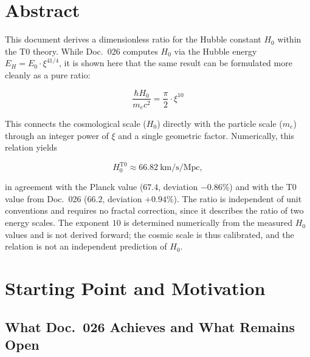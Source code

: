 
\section*{Abstract}

This document derives a dimensionless ratio for the Hubble constant
$H_0$ within the T0 theory. While Doc.~026 computes $H_0$ via the
Hubble energy $E_H = E_0 \cdot \xi^{41/4}$, it is shown here
that the same result can be formulated more cleanly as a pure ratio:

\begin{equation}
    \boxed{\frac{\hbar H_0}{m_e c^2} = \frac{\pi}{2} \cdot \xi^{10}}
    \label{eq:h0_ratio_main}
\end{equation}

This connects the cosmological scale ($H_0$) directly with the particle scale
($m_e$) through an integer power of $\xi$ and a single
geometric factor. Numerically, this relation yields

\[
H_0^{\text{T0}} \approx 66.82 \ \text{km/s/Mpc},
\]

in agreement with the Planck value ($67.4$, deviation $-0.86\%$) and with the
T0 value from Doc.~026 ($66.2$, deviation $+0.94\%$). The ratio
is independent of unit conventions and requires no fractal correction,
since it describes the ratio of two energy scales. The exponent $10$ is
determined numerically from the measured $H_0$ values and is not derived
forward; the cosmic scale is thus calibrated, and the relation is not an
independent prediction of $H_0$.

\clearpage

\section{Starting Point and Motivation}
\label{sec:motivation}

\subsection{What Doc.~026 Achieves and What Remains Open}

